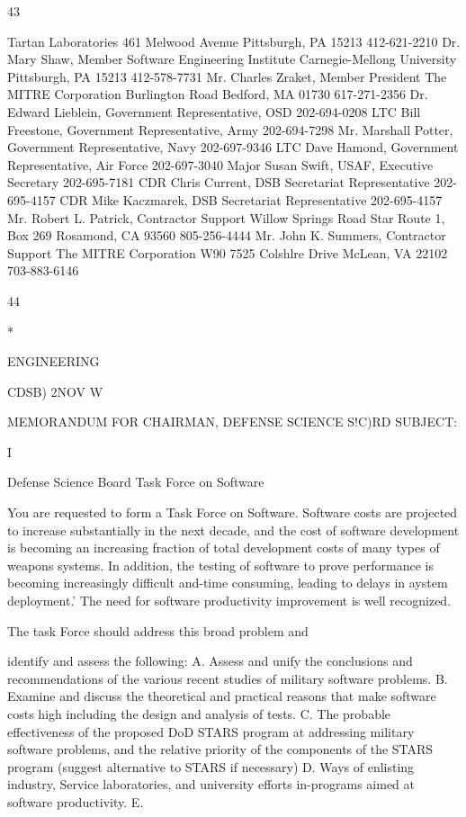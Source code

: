 \documentclass[12pt]{article}
\begin{document}
43

Tartan Laboratories
461 Melwood Avenue
Pittsburgh, PA 15213
412-621-2210
Dr. Mary Shaw, Member
Software Engineering Institute
Carnegie-Mellong University
Pittsburgh, PA 15213
412-578-7731
Mr. Charles Zraket, Member
President
The MITRE Corporation
Burlington Road
Bedford, MA 01730
617-271-2356
Dr. Edward Lieblein, Government Representative, OSD
202-694-0208
LTC Bill Freestone, Government Representative, Army
202-694-7298
Mr. Marshall Potter, Government Representative, Navy
202-697-9346
LTC Dave Hamond, Government Representative, Air Force
202-697-3040
Major Susan Swift, USAF, Executive Secretary
202-695-7181
CDR Chris Current, DSB Secretariat Representative
202-695-4157
CDR Mike Kaczmarek, DSB Secretariat Representative
202-695-4157
Mr. Robert L. Patrick, Contractor Support
Willow Springs Road
Star Route 1, Box 269
Rosamond, CA 93560
805-256-4444
Mr. John K. Summers, Contractor Support
The MITRE Corporation W90
7525 Colshlre Drive
McLean, VA 22102
703-883-6146

44

*

ENGINEERING

CDSB)
2NOV W

MEMORANDUM FOR CHAIRMAN, DEFENSE SCIENCE S!C)RD
SUBJECT:

I

Defense Science Board Task Force on Software

You are requested to form a Task Force on Software.
Software costs are projected to increase substantially in the
next decade, and the cost of software development is becoming an
increasing fraction of total development costs of many types of
weapons systems. In addition, the testing of software to prove
performance is becoming increasingly difficult and-time
consuming, leading to delays in aystem deployment.' The need for
software productivity improvement is well recognized.

The task Force should address this broad problem and

identify and assess the following:
A.
Assess and unify the conclusions and recommendations
of the various recent studies of military software problems.
B.
Examine and discuss the theoretical and practical
reasons that make software costs high including the design and
analysis of tests.
C.
The probable effectiveness of the proposed DoD STARS
program at addressing military software problems, and the
relative priority of the components of the STARS program
(suggest alternative to STARS if necessary)
D. Ways of enlisting industry, Service laboratories, and
university efforts in-programs aimed at software productivity.
E.
\end{document}
